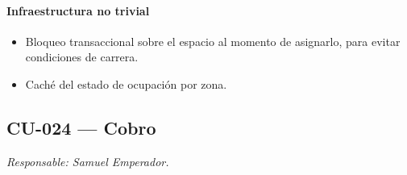 \paragraph{Infraestructura no trivial}
\begin{itemize}[leftmargin=1.4em, topsep=1pt]
  \item Bloqueo transaccional sobre el espacio al momento de asignarlo, para evitar condiciones de carrera.
  \item Caché del estado de ocupación por zona.
\end{itemize}

\subsection{CU-024 --- Cobro}
\label{cu:cu-024}
\textit{Responsable: Samuel Emperador.}

